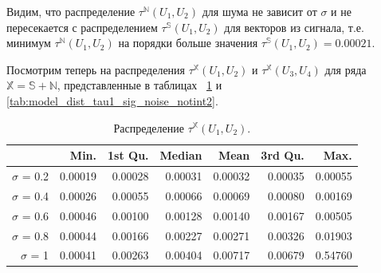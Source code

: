 \documentclass[specialist,
               substylefile = spbu.rtx,
               subf,href,colorlinks=true, 12pt]{disser}
\begin{document}
Видим, что распределение $\tau^{\mathbb{N}}(U_1, U_2)$ для шума не зависит от $\sigma$ и не пересекается с распределением $\tau^{\mathbb{S}}(U_1, U_2)$ для векторов из сигнала, т.е. минимум $\tau^{\mathbb{N}}(U_1, U_2)$ на порядки больше значения $\tau^{\mathbb{S}}(U_1, U_2) = 0.00021$.
%
%


Посмотрим теперь на распределения  $\tau^{\mathbb{X}}(U_1, U_2)$ и  $\tau^{\mathbb{X}}(U_3, U_4)$ для ряда $\mathbb{X} = \mathbb{S} + \mathbb{N}$, представленные в таблицах ~\ref{tab:model_dist_tau1_sig_noise_notint} и \ref{tab:model_dist_tau1_sig_noise_notint2}.

\begin{table}[hhh!]
\caption{Распределение $\tau^{\mathbb{X}}(U_1, U_2)$.}
\centering
\begin{tabular}{rrrrrrr}
  \hline
 & Min. & 1st Qu. & Median & Mean & 3rd Qu. & Max. \\
  \hline
$\sigma$ = 0.2 & 0.00019 & 0.00028 & 0.00031 & 0.00032 & 0.00035 & 0.00055 \\ 
  $\sigma$ = 0.4 & 0.00026 & 0.00055 & 0.00066 & 0.00069 & 0.00080 & 0.00169 \\ 
  $\sigma$ = 0.6 & 0.00046 & 0.00100 & 0.00128 & 0.00140 & 0.00167 & 0.00505 \\ 
  $\sigma$ = 0.8 & 0.00044 & 0.00166 & 0.00227 & 0.00271 & 0.00326 & 0.01903 \\ 
  $\sigma$ = 1 & 0.00041 & 0.00263 & 0.00404 & 0.00717 & 0.00679 & 0.54760 \\ 
   \hline
\end{tabular}
\label{tab:model_dist_tau1_sig_noise_notint}
\end{table}
\end{document}

